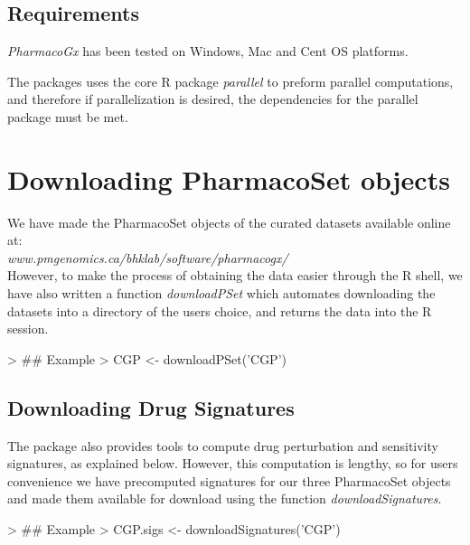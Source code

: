 \documentclass[11pt]{article}
\begin{document}
\subsection*{Requirements}

\textit{PharmacoGx} has been tested on Windows, Mac and Cent OS platforms.

The packages uses the core R package \textit{parallel} to preform parallel computations, and therefore if parallelization is desired, the dependencies for the parallel package must be met. 

\section{Downloading PharmacoSet objects}

We have made the PharmacoSet objects of the curated datasets available online at:\\ \textit{www.pmgenomics.ca/bhklab/software/pharmacogx/}\\
However, to make the process of obtaining the data easier through the R shell, we have also written a function \textit{downloadPSet} which automates downloading the datasets into a directory of the users choice, and returns the data into the R session. 

\begin{Schunk}
\begin{Sinput}
> ## Example
> CGP <- downloadPSet('CGP') 
\end{Sinput}
\end{Schunk}
\subsection*{Downloading Drug Signatures}

The package also provides tools to compute drug perturbation and sensitivity signatures, as explained below. However, this computation is lengthy, so for users convenience we have precomputed signatures for our three PharmacoSet objects and made them available for download using the function \textit{downloadSignatures}.

\begin{Schunk}
\begin{Sinput}
> ## Example
> CGP.sigs <- downloadSignatures('CGP')
\end{Sinput}
\end{Schunk}
\end{document}
